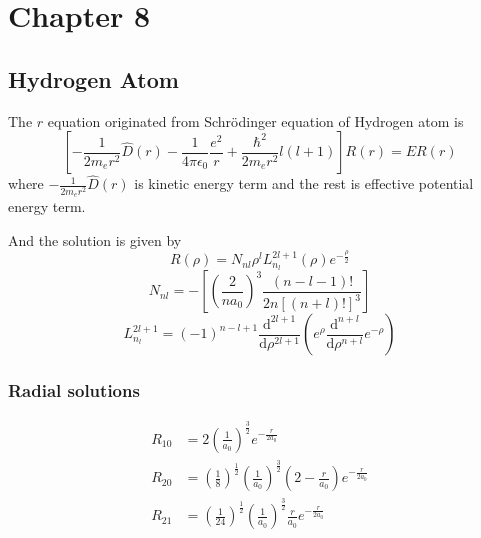 \documentclass[letterpaper]{article}
\newcommand{\diff}{\mathrm{d}}
\begin{document}
\newpage
\section*{Chapter 8}
\subsection*{Hydrogen Atom}
The $r$ equation originated from Schrödinger equation of Hydrogen atom is
\begin{equation*}
    \left[-\frac{1}{2m_er^2}\hat{D}(r)-\frac{1}{4\pi\epsilon_0}\frac{e^2}{r}+
        \frac{\hbar^2}{2m_er^2}l(l+1)\right]R(r)=ER(r)
\end{equation*}
where $-\frac{1}{2m_er^2}\hat{D}(r)$ is kinetic energy term and the rest is effective
potential energy term.

And the solution is given by
\begin{equation*}
    R(\rho)=N_{nl}\rho^lL^{2l+1}_{n_l}(\rho)e^{-\frac{\rho}{2}}
\end{equation*}
\begin{equation*}
    N_{nl}=-\left[\left(\frac{2}{na_0}\right)^3\frac{(n-l-1)!}{2n[(n+l)!]^3}\right]
\end{equation*}
\begin{equation*}
    L^{2l+1}_{n_l}=(-1)^{n-l+1}\frac{\diff ^{2l+1}}{\diff\rho^{2l+1}}\left(
    e^\rho\frac{\diff^{n+l}}{\diff\rho^{n+l}}e^{-\rho}
    \right)
\end{equation*}
\subsubsection*{Radial solutions}
\begin{equation*}
    \begin{aligned}
        R_{10} & =2\left(\frac{1}{a_0}\right)^{\frac{3}{2}}e^{-\frac{r}{2a_0}}                    \\
        R_{20} & =\left(\frac{1}{8}\right)^{\frac{1}{2}}\left(\frac{1}{a_0}\right)^{\frac{3}{2}}
        \left(2-\frac{r}{a_0}\right)e^{-\frac{r}{2a_0}}                                           \\
        R_{21} & =\left(\frac{1}{24}\right)^{\frac{1}{2}}\left(\frac{1}{a_0}\right)^{\frac{3}{2}}
        \frac{r}{a_0}e^{-\frac{r}{2a_0}}
    \end{aligned}
\end{equation*}
\end{document}
